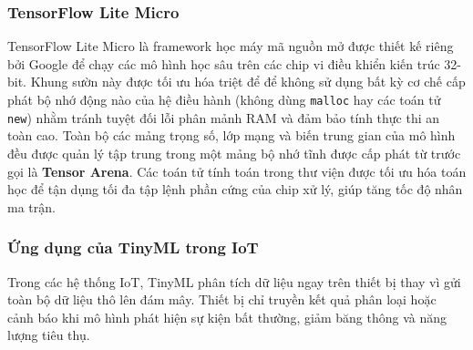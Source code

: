 \subsubsection{TensorFlow Lite Micro}
TensorFlow Lite Micro là framework học máy mã nguồn mở được thiết kế riêng bởi Google để chạy các mô hình học sâu trên các chip vi điều khiển kiến trúc 32-bit. Khung sườn này được tối ưu hóa triệt để để không sử dụng bất kỳ cơ chế cấp phát bộ nhớ động nào của hệ điều hành (không dùng \texttt{malloc} hay các toán tử \texttt{new}) nhằm tránh tuyệt đối lỗi phân mảnh RAM và đảm bảo tính thực thi an toàn cao. Toàn bộ các mảng trọng số, lớp mạng và biến trung gian của mô hình đều được quản lý tập trung trong một mảng bộ nhớ tĩnh được cấp phát từ trước gọi là \textbf{Tensor Arena}. Các toán tử tính toán trong thư viện được tối ưu hóa toán học để tận dụng tối đa tập lệnh phần cứng của chip xử lý, giúp tăng tốc độ nhân ma trận.

\subsubsection{Ứng dụng của TinyML trong IoT}
Trong các hệ thống IoT, TinyML phân tích dữ liệu ngay trên thiết bị thay vì gửi toàn bộ dữ liệu thô lên đám mây. Thiết bị chỉ truyền kết quả phân loại hoặc cảnh báo khi mô hình phát hiện sự kiện bất thường, giảm băng thông và năng lượng tiêu thụ.
